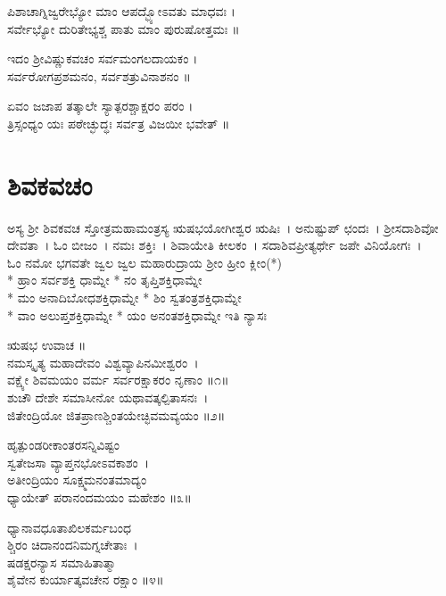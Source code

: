 ಪಿಶಾಚಾಗ್ನಿಜ್ವರೇಭ್ಯೋ ಮಾಂ ಆಪದ್ಭ್ಯೋಽವತು ಮಾಧವಃ ।\\
ಸರ್ವೇಭ್ಯೋ ದುರಿತೇಭ್ಯಶ್ಚ ಪಾತು ಮಾಂ ಪುರುಷೋತ್ತಮಃ ॥

ಇದಂ ಶ್ರೀವಿಷ್ಣುಕವಚಂ ಸರ್ವಮಂಗಲದಾಯಕಂ ।\\
ಸರ್ವರೋಗಪ್ರಶಮನಂ, ಸರ್ವಶತ್ರುವಿನಾಶನಂ ॥

ಏವಂ ಜಜಾಪ ತತ್ಕಾಲೇ ಸ್ಯಾತ್ಪರಶ್ಚಾಕ್ಷರಂ ಪರಂ ।\\
ತ್ರಿಸ್ಸಂಧ್ಯಂ ಯಃ ಪಠೇಚ್ಛುದ್ಧಃ ಸರ್ವತ್ರ ವಿಜಯೀ ಭವೇತ್ ॥
\section{ಶಿವಕವಚಂ }
ಅಸ್ಯ ಶ್ರೀ ಶಿವಕವಚ ಸ್ತೋತ್ರಮಹಾಮಂತ್ರಸ್ಯ ಋಷಭಯೋಗೀಶ್ವರ ಋಷಿಃ~। ಅನುಷ್ಟುಪ್ ಛಂದಃ~। ಶ್ರೀಸದಾಶಿವೋ ದೇವತಾ~। ಓಂ ಬೀಜಂ~। ನಮಃ ಶಕ್ತಿಃ~। ಶಿವಾಯೇತಿ ಕೀಲಕಂ~। ಸದಾಶಿವಪ್ರೀತ್ಯರ್ಥೇ ಜಪೇ ವಿನಿಯೋಗಃ~।\\
ಓಂ ನಮೋ ಭಗವತೇ ಜ್ವಲ ಜ್ವಲ ಮಹಾರುದ್ರಾಯ ಶ್ರೀಂ ಹ್ರೀಂ ಕ್ಲೀಂ(*)\\
 * ಹ್ರಾಂ ಸರ್ವಶಕ್ತಿ ಧಾಮ್ನೇ
 * ನಂ ತೃಪ್ತಿಶಕ್ತಿಧಾಮ್ನೇ\\
 * ಮಂ ಅನಾದಿಬೋಧಶಕ್ತಿಧಾಮ್ನೇ
 * ಶಿಂ ಸ್ವತಂತ್ರಶಕ್ತಿಧಾಮ್ನೇ\\
 * ವಾಂ ಅಲುಪ್ತಶಕ್ತಿಧಾಮ್ನೇ
 * ಯಂ ಅನಂತಶಕ್ತಿಧಾಮ್ನೇ ಇತಿ ನ್ಯಾಸಃ\\

ಋಷಭ ಉವಾಚ ॥\\
ನಮಸ್ಕೃತ್ಯ ಮಹಾದೇವಂ ವಿಶ್ವವ್ಯಾಪಿನಮೀಶ್ವರಂ~।\\
ವಕ್ಷ್ಯೇ ಶಿವಮಯಂ ವರ್ಮ ಸರ್ವರಕ್ಷಾಕರಂ ನೃಣಾಂ ॥೧॥\\
ಶುಚೌ ದೇಶೇ ಸಮಾಸೀನೋ ಯಥಾವತ್ಕಲ್ಪಿತಾಸನಃ~।\\
ಜಿತೇಂದ್ರಿಯೋ ಜಿತಪ್ರಾಣಶ್ಚಿಂತಯೇಚ್ಛಿವಮವ್ಯಯಂ ॥೨॥

ಹೃತ್ಪುಂಡರೀಕಾಂತರಸನ್ನಿವಿಷ್ಟಂ\\ಸ್ವತೇಜಸಾ ವ್ಯಾಪ್ತನಭೋಽವಕಾಶಂ~।\\
ಅತೀಂದ್ರಿಯಂ ಸೂಕ್ಷ್ಮಮನಂತಮಾದ್ಯಂ\\ಧ್ಯಾಯೇತ್ ಪರಾನಂದಮಯಂ ಮಹೇಶಂ ॥೩॥

ಧ್ಯಾನಾವಧೂತಾಖಿಲಕರ್ಮಬಂಧ\\ಶ್ಚಿರಂ ಚಿದಾನಂದನಿಮಗ್ನಚೇತಾಃ~।\\
ಷಡಕ್ಷರನ್ಯಾಸ ಸಮಾಹಿತಾತ್ಮಾ\\ಶೈವೇನ ಕುರ್ಯಾತ್ಕವಚೇನ ರಕ್ಷಾಂ ॥೪॥

